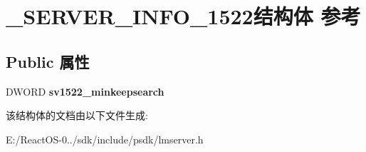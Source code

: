 \hypertarget{struct___s_e_r_v_e_r___i_n_f_o__1522}{}\section{\+\_\+\+S\+E\+R\+V\+E\+R\+\_\+\+I\+N\+F\+O\+\_\+1522结构体 参考}
\label{struct___s_e_r_v_e_r___i_n_f_o__1522}
\subsection*{Public 属性}
\begin{DoxyCompactItemize}
\item 
\mbox{\label{struct___s_e_r_v_e_r___i_n_f_o__1522_a450599072bb16ca60bb05ad7d1f7f11d}} 
D\+W\+O\+RD {\bfseries sv1522\+\_\+minkeepsearch}
\end{DoxyCompactItemize}


该结构体的文档由以下文件生成\+:\begin{DoxyCompactItemize}
\item 
E\+:/\+React\+O\+S-\/0../sdk/include/psdk/lmserver.\+h\end{DoxyCompactItemize}
